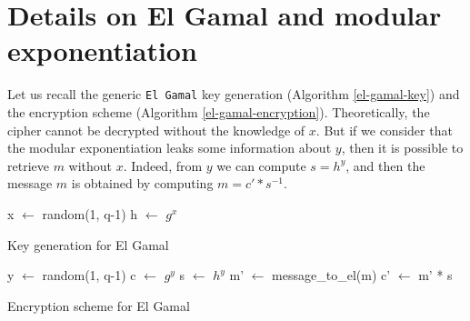 \documentclass[journal]{IEEEtran}
\begin{document}
\appendices
\section{Details on El Gamal and modular exponentiation}
\label{ElGamal}
Let us recall the generic {\tt El Gamal} key generation (Algorithm \ref{el-gamal-key})
and the encryption scheme (Algorithm \ref{el-gamal-encryption}).
Theoretically, the cipher cannot be decrypted without the knowledge of $x$. But if we consider that
the modular exponentiation leaks some information about $y$, then it is possible to retrieve $m$ without $x$.
Indeed, from $y$ we can compute $s = h^y$, and then the message $m$ is obtained by computing $m = c' * s^{-1}$.


\begin{algorithm}
    \SetAlgoLined %
   
    \SetSideCommentLeft 
    \SetNoFillComment

    
    
    x $\leftarrow$ random(1, q-1)\;
    h $\leftarrow$ $g^x$\;


    \bigskip

    \caption{Key generation for El Gamal}
    \label{el-gamal-key}

\end{algorithm}

\begin{algorithm}
    \SetAlgoLined %
   
    \SetSideCommentLeft 
    \SetNoFillComment

    
    
    y $\leftarrow$ random(1, q-1)\;
    c $\leftarrow$ $g^y$
    s $\leftarrow$ $h^y$\;
    m' $\leftarrow$ message\_to\_el(m)\;
    c' $\leftarrow$ m' * s\;

    \bigskip

    \caption{Encryption scheme for El Gamal}
    \label{el-gamal-encryption}

\end{algorithm}
\end{document}
